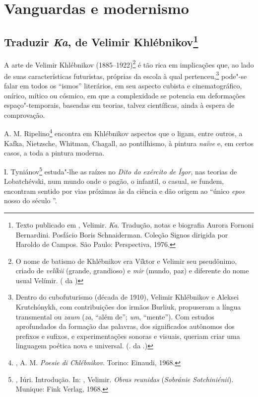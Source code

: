 \part{Vanguardas e modernismo}

\chapter{Traduzir \emph{Ka}, de Velimir
Khlébnikov\footnote{Texto publicado em {},
Velimir. \emph{Ka}. Tradução, notas e biografia Aurora Fornoni
Bernardini. Posfácio Boris Schnaiderman. Coleção Signos dirigida
por Haroldo de Campos. São Paulo: Perspectiva, 1976.}}

A arte de Velimir Khlébnikov (1885--1922)\footnote{O nome de
batismo de Khlébnikov era Víktor e Velimir seu pseudônimo, criado
de \emph{velíkii} (grande, grandioso) e \emph{mir} (mundo, paz) e
diferente do nome usual Velímir. ( da )} é
tão rica em implicações que, ao lado de suas características
futuristas, próprias da escola à qual pertenceu,\footnote{Dentro
do cubofuturismo (década de 1910), Velimir Khlébnikov e Aleksei
Krutchónykh, com contribuições dos irmãos Burliuk, propuseram
a língua transmental ou \emph{zaum} (\emph{za}, ``além de'';
\emph{um}, ``mente''). Com estudos aprofundados da formação
das palavras, dos significados autônomos dos prefixos e sufixos,
e experimentações sonoras e visuais, queriam criar uma linguagem
poética nova e universal. (. da .)} pode"-se falar
em todos os ``ismos'' literários, em seu aspecto cubista e
cinematográfico, onírico, mítico ou cósmico, em que a complexidade
se potencia em deformações espaço"-temporais, baseadas em teorias,
talvez científicas, ainda à espera de comprovação.

A. M. Ripelino\footnote{, A. M. \emph{Poesie
di Chlébnikov}. Torino: Einaudi, 1968.} encontra em Khlébnikov
aspectos que o ligam, entre outros, a Kafka, Nietzsche, Whitman,
Chagall, ao pontilhismo, à pintura \emph{naïve} e, em certos
casos, a toda a pintura moderna.

I. Tyniánov\footnote{, Iúri. Introdução. In:
, Velimir. \emph{Obras reunidas}
(\emph{Sobránie Sotchiniénii}). Munique: Fink Verlag, 1968.}
estuda"-lhe as raízes no \emph{Dito do exército de Ígor,} nas
teorias de Lobatchévski, num mundo onde o pagão, o infantil,
o casual, se fundem, encontram sentido por vias próximas às
da ciência e dão origem ao ``único \emph{epos} nosso do século ''.


